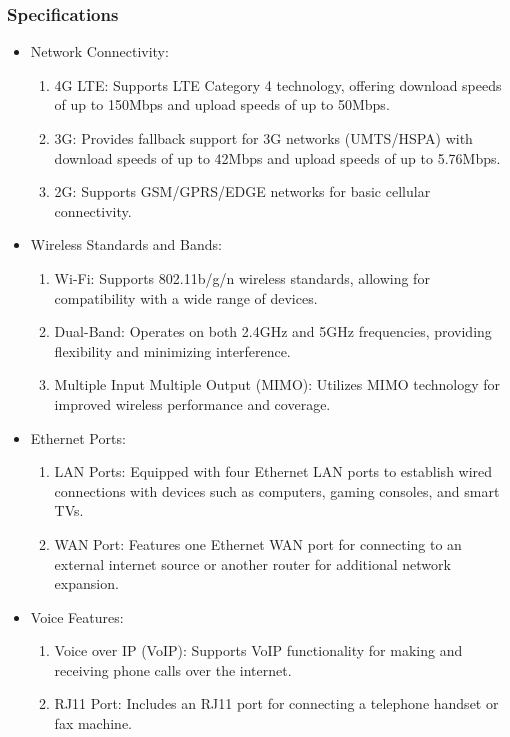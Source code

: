 \documentclass[
12pt,
oneside, 
onehalfspacing, 
nolistspacing, 
parskip, 
chapterinoneline, 
]{AASTCOMPUTER}
\begin{document}
\subsubsection{Specifications}
\begin{itemize}
    \item Network Connectivity:
    \begin{enumerate}
        \item 4G LTE: Supports LTE Category 4 technology, offering download speeds of up to 150Mbps and upload speeds of up to 50Mbps.
        \item 3G: Provides fallback support for 3G networks (UMTS/HSPA) with download speeds of up to 42Mbps and upload speeds of up to 5.76Mbps.
        \item 2G: Supports GSM/GPRS/EDGE networks for basic cellular connectivity.
    \end{enumerate}
    \item Wireless Standards and Bands:
    \begin{enumerate}
        \item Wi-Fi: Supports 802.11b/g/n wireless standards, allowing for compatibility with a wide range of devices.
        \item Dual-Band: Operates on both 2.4GHz and 5GHz frequencies, providing flexibility and minimizing interference.
        \item Multiple Input Multiple Output (MIMO): Utilizes MIMO technology for improved wireless performance and coverage.
    \end{enumerate}
    \item Ethernet Ports:
    \begin{enumerate}
        \item LAN Ports: Equipped with four Ethernet LAN ports to establish wired connections with devices such as computers, gaming consoles, and smart TVs.
        \item WAN Port: Features one Ethernet WAN port for connecting to an external internet source or another router for additional network expansion.
    \end{enumerate}
    \item Voice Features:
    \begin{enumerate}
        \item Voice over IP (VoIP): Supports VoIP functionality for making and receiving phone calls over the internet.
        \item RJ11 Port: Includes an RJ11 port for connecting a telephone handset or fax machine.

\end{enumerate}
\end{itemize}
\end{document}
